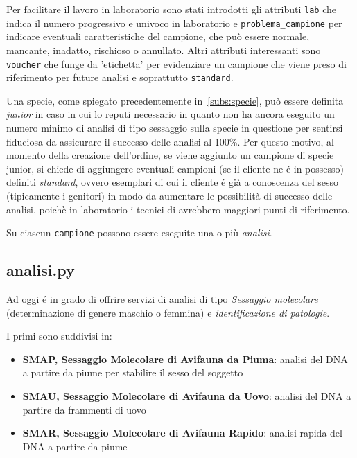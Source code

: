 Per facilitare il lavoro in laboratorio sono stati introdotti gli attributi \texttt{lab} che indica il numero progressivo e univoco in laboratorio e \texttt{problema\_campione} per indicare eventuali caratteristiche del campione, che può essere normale, mancante, inadatto, rischioso o annullato. Altri attributi interessanti sono \texttt{voucher} che funge da 'etichetta' per evidenziare un campione che viene preso di riferimento per future analisi e soprattutto \texttt{standard}.

Una specie, come spiegato precedentemente in~\ref{subs:specie}, può essere definita \emph{junior} in caso in cui {\fem} lo reputi necessario in quanto non ha ancora eseguito un numero minimo di analisi di tipo sessaggio sulla specie in questione per sentirsi fiduciosa da assicurare il successo delle analisi al 100\%. Per questo motivo, al momento della creazione dell'ordine, se viene aggiunto un campione di specie junior, si chiede di aggiungere eventuali campioni (se il cliente ne é in possesso) definiti \emph{standard}, ovvero esemplari di cui il cliente é già a conoscenza del sesso (tipicamente i genitori) in modo da aumentare le possibilità di successo delle analisi, poichè in laboratorio i tecnici di {\fem} avrebbero maggiori punti di riferimento.

Su ciascun \texttt{campione} possono essere eseguite una o più \emph{analisi}.

\subsection*{analisi.py}
\label{subs:analisi}
Ad oggi {\fem} é in grado di offrire servizi di analisi di tipo \emph{Sessaggio molecolare} (determinazione di genere maschio o femmina) e \emph{identificazione di patologie}.

I primi sono suddivisi in:
\begin{itemize}
 \item \textbf{SMAP, Sessaggio Molecolare di Avifauna da Piuma}: analisi del DNA a partire da piume per stabilire il sesso del soggetto    
 \item \textbf{SMAU, Sessaggio Molecolare di Avifauna da Uovo}: analisi del DNA a partire da frammenti di uovo 
 \item \textbf{SMAR, Sessaggio Molecolare di Avifauna Rapido}: analisi rapida del DNA a partire da piume
\end{itemize}

